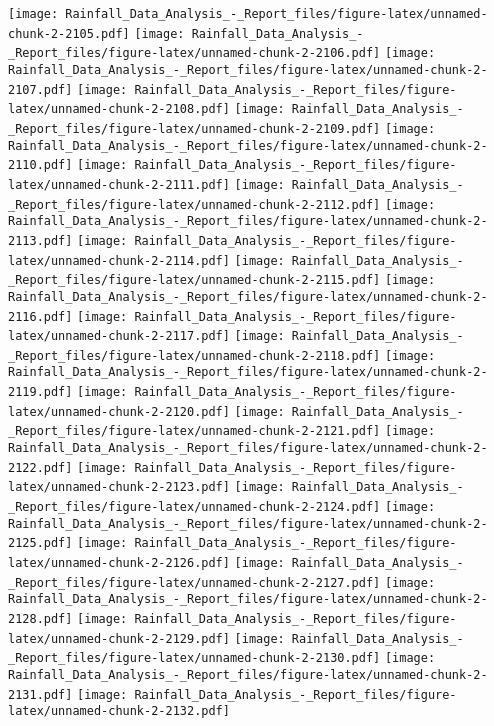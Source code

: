 \documentclass[
]{article}
\begin{document}
\texttt{[image: Rainfall\_Data\_Analysis\_-\_Report\_files/figure-latex/unnamed-chunk-2-2105.pdf]}
\texttt{[image: Rainfall\_Data\_Analysis\_-\_Report\_files/figure-latex/unnamed-chunk-2-2106.pdf]}
\texttt{[image: Rainfall\_Data\_Analysis\_-\_Report\_files/figure-latex/unnamed-chunk-2-2107.pdf]}
\texttt{[image: Rainfall\_Data\_Analysis\_-\_Report\_files/figure-latex/unnamed-chunk-2-2108.pdf]}
\texttt{[image: Rainfall\_Data\_Analysis\_-\_Report\_files/figure-latex/unnamed-chunk-2-2109.pdf]}
\texttt{[image: Rainfall\_Data\_Analysis\_-\_Report\_files/figure-latex/unnamed-chunk-2-2110.pdf]}
\texttt{[image: Rainfall\_Data\_Analysis\_-\_Report\_files/figure-latex/unnamed-chunk-2-2111.pdf]}
\texttt{[image: Rainfall\_Data\_Analysis\_-\_Report\_files/figure-latex/unnamed-chunk-2-2112.pdf]}
\texttt{[image: Rainfall\_Data\_Analysis\_-\_Report\_files/figure-latex/unnamed-chunk-2-2113.pdf]}
\texttt{[image: Rainfall\_Data\_Analysis\_-\_Report\_files/figure-latex/unnamed-chunk-2-2114.pdf]}
\texttt{[image: Rainfall\_Data\_Analysis\_-\_Report\_files/figure-latex/unnamed-chunk-2-2115.pdf]}
\texttt{[image: Rainfall\_Data\_Analysis\_-\_Report\_files/figure-latex/unnamed-chunk-2-2116.pdf]}
\texttt{[image: Rainfall\_Data\_Analysis\_-\_Report\_files/figure-latex/unnamed-chunk-2-2117.pdf]}
\texttt{[image: Rainfall\_Data\_Analysis\_-\_Report\_files/figure-latex/unnamed-chunk-2-2118.pdf]}
\texttt{[image: Rainfall\_Data\_Analysis\_-\_Report\_files/figure-latex/unnamed-chunk-2-2119.pdf]}
\texttt{[image: Rainfall\_Data\_Analysis\_-\_Report\_files/figure-latex/unnamed-chunk-2-2120.pdf]}
\texttt{[image: Rainfall\_Data\_Analysis\_-\_Report\_files/figure-latex/unnamed-chunk-2-2121.pdf]}
\texttt{[image: Rainfall\_Data\_Analysis\_-\_Report\_files/figure-latex/unnamed-chunk-2-2122.pdf]}
\texttt{[image: Rainfall\_Data\_Analysis\_-\_Report\_files/figure-latex/unnamed-chunk-2-2123.pdf]}
\texttt{[image: Rainfall\_Data\_Analysis\_-\_Report\_files/figure-latex/unnamed-chunk-2-2124.pdf]}
\texttt{[image: Rainfall\_Data\_Analysis\_-\_Report\_files/figure-latex/unnamed-chunk-2-2125.pdf]}
\texttt{[image: Rainfall\_Data\_Analysis\_-\_Report\_files/figure-latex/unnamed-chunk-2-2126.pdf]}
\texttt{[image: Rainfall\_Data\_Analysis\_-\_Report\_files/figure-latex/unnamed-chunk-2-2127.pdf]}
\texttt{[image: Rainfall\_Data\_Analysis\_-\_Report\_files/figure-latex/unnamed-chunk-2-2128.pdf]}
\texttt{[image: Rainfall\_Data\_Analysis\_-\_Report\_files/figure-latex/unnamed-chunk-2-2129.pdf]}
\texttt{[image: Rainfall\_Data\_Analysis\_-\_Report\_files/figure-latex/unnamed-chunk-2-2130.pdf]}
\texttt{[image: Rainfall\_Data\_Analysis\_-\_Report\_files/figure-latex/unnamed-chunk-2-2131.pdf]}
\texttt{[image: Rainfall\_Data\_Analysis\_-\_Report\_files/figure-latex/unnamed-chunk-2-2132.pdf]}
\end{document}
